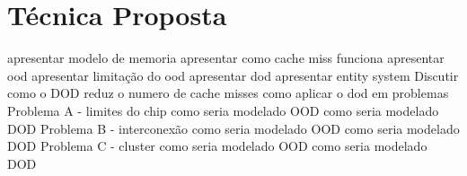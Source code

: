  \chapter{Técnica Proposta}
\label{cap:tecnica_proposta}



apresentar modelo de memoria
apresentar como cache miss funciona
apresentar ood
apresentar limitação do ood
apresentar dod
apresentar entity system
Discutir como o DOD reduz o numero de cache misses
como aplicar o dod em problemas
    Problema A - limites do chip
        como seria modelado OOD
        como seria modelado DOD
    Problema B - interconexão
        como seria modelado OOD
        como seria modelado DOD
    Problema C - cluster
        como seria modelado OOD
        como seria modelado DOD
